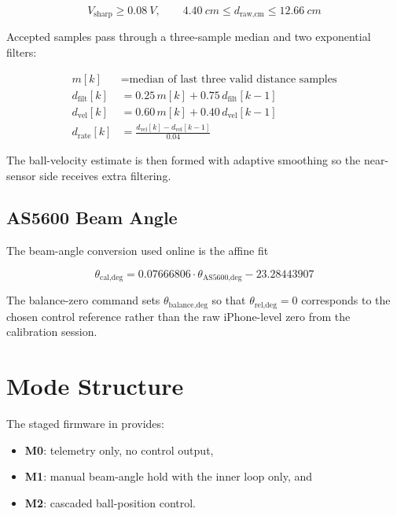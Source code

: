 \begin{equation}
  V_{\text{sharp}} \ge \SI{0.08}{V},
  \qquad
  \SI{4.40}{cm} \le d_{\text{raw,cm}} \le \SI{12.66}{cm}
\end{equation}

Accepted samples pass through a three-sample median and two exponential filters:

\begin{align}
  m[k] &= \text{median of last three valid distance samples} \\
  d_{\text{filt}}[k] &= 0.25\,m[k] + 0.75\,d_{\text{filt}}[k-1] \\
  d_{\text{vel}}[k] &= 0.60\,m[k] + 0.40\,d_{\text{vel}}[k-1] \\
  d_{\text{rate}}[k] &= \frac{d_{\text{vel}}[k] - d_{\text{vel}}[k-1]}{0.04}
\end{align}

The ball-velocity estimate is then formed with adaptive smoothing so the near-sensor
side receives extra filtering.

\subsection{AS5600 Beam Angle}

The beam-angle conversion used online is the affine fit

\begin{equation}
  \theta_{\text{cal,deg}}
  = 0.07666806 \cdot \theta_{\text{AS5600,deg}} - 23.28443907
\end{equation}

The balance-zero command sets $\theta_{\text{balance,deg}}$ so that
$\theta_{\text{rel,deg}} = 0$ corresponds to the chosen control reference rather than
the raw iPhone-level zero from the calibration session.

\section{Mode Structure}

The staged firmware in  provides:

\begin{itemize}
  \item \textbf{M0}: telemetry only, no control output,
  \item \textbf{M1}: manual beam-angle hold with the inner loop only, and
  \item \textbf{M2}: cascaded ball-position control.
\end{itemize}


